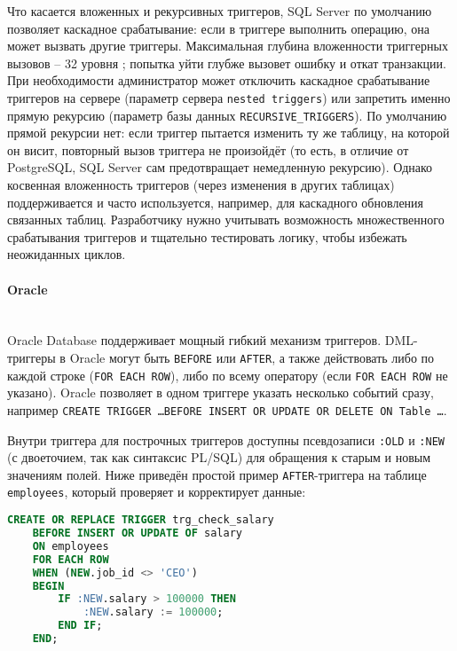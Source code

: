Что касается вложенных и рекурсивных триггеров, SQL Server по умолчанию позволяет каскадное срабатывание: если в триггере выполнить операцию, она может вызвать другие триггеры. Максимальная глубина вложенности триггерных вызовов – 32 уровня  \autocite{MicrosoftLearnNestTrig}; попытка уйти глубже вызовет ошибку и откат транзакции. При необходимости администратор может отключить каскадное срабатывание триггеров на сервере (параметр сервера \texttt{nested triggers}) или запретить именно прямую рекурсию (параметр базы данных \texttt{RECURSIVE\_TRIGGERS}). По умолчанию прямой рекурсии нет: если триггер пытается изменить ту же таблицу, на которой он висит, повторный вызов триггера не произойдёт (то есть, в отличие от PostgreSQL, SQL Server сам предотвращает немедленную рекурсию). Однако косвенная вложенность триггеров (через изменения в других таблицах) поддерживается и часто используется, например, для каскадного обновления связанных таблиц. Разработчику нужно учитывать возможность множественного срабатывания триггеров и тщательно тестировать логику, чтобы избежать неожиданных циклов.

\paragraph{\textbf{Oracle}} ~\\

 Oracle Database поддерживает мощный гибкий механизм триггеров. DML-триггеры в Oracle могут быть \texttt{BEFORE} или \texttt{AFTER}, а также действовать либо по каждой строке (\texttt{FOR EACH ROW}), либо по всему оператору (если \texttt{FOR EACH ROW} не указано). Oracle позволяет в одном триггере указать несколько событий сразу, например \texttt{CREATE TRIGGER \ldots BEFORE INSERT OR UPDATE OR DELETE ON Table \ldots}. 
 
 Внутри триггера для построчных триггеров доступны псевдозаписи \texttt{:OLD} и \texttt{:NEW} (с двоеточием, так как синтаксис PL/SQL) для обращения к старым и новым значениям полей. Ниже приведён простой пример \texttt{AFTER}-триггера на таблице \texttt{employees}, который проверяет и корректирует данные:
 \begin{lstlisting}[language=SQL]
    CREATE OR REPLACE TRIGGER trg_check_salary
    BEFORE INSERT OR UPDATE OF salary
    ON employees
    FOR EACH ROW
    WHEN (NEW.job_id <> 'CEO')
    BEGIN
        IF :NEW.salary > 100000 THEN
            :NEW.salary := 100000;
        END IF;
    END;
 \end{lstlisting}

